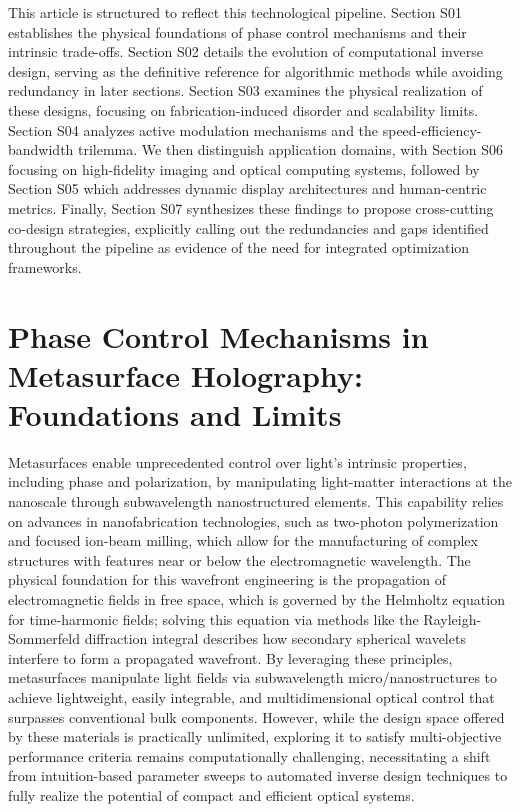 \documentclass[11pt]{article}
\begin{document}
This article is structured to reflect this technological pipeline. Section S01 establishes the physical foundations of phase control mechanisms and their intrinsic trade-offs. Section S02 details the evolution of computational inverse design, serving as the definitive reference for algorithmic methods while avoiding redundancy in later sections. Section S03 examines the physical realization of these designs, focusing on fabrication-induced disorder and scalability limits. Section S04 analyzes active modulation mechanisms and the speed-efficiency-bandwidth trilemma. We then distinguish application domains, with Section S06 focusing on high-fidelity imaging and optical computing systems, followed by Section S05 which addresses dynamic display architectures and human-centric metrics. Finally, Section S07 synthesizes these findings to propose cross-cutting co-design strategies, explicitly calling out the redundancies and gaps identified throughout the pipeline as evidence of the need for integrated optimization frameworks.

\section{Phase Control Mechanisms in Metasurface Holography: Foundations and Limits}\label{phase-control-mechanisms-in-metasurface-holography-foundations-and-limits}

Metasurfaces enable unprecedented control over light's intrinsic properties, including phase and polarization, by manipulating light-matter interactions at the nanoscale through subwavelength nanostructured elements. This capability relies on advances in nanofabrication technologies, such as two-photon polymerization and focused ion-beam milling, which allow for the manufacturing of complex structures with features near or below the electromagnetic wavelength. The physical foundation for this wavefront engineering is the propagation of electromagnetic fields in free space, which is governed by the Helmholtz equation for time-harmonic fields; solving this equation via methods like the Rayleigh-Sommerfeld diffraction integral describes how secondary spherical wavelets interfere to form a propagated wavefront. \citep{doi_10_21236_ada421453_63603a3f} \citep{doi_10_1364_ol_509688_f6e1ff85} By leveraging these principles, metasurfaces manipulate light fields via subwavelength micro/nanostructures to achieve lightweight, easily integrable, and multidimensional optical control that surpasses conventional bulk components. However, while the design space offered by these materials is practically unlimited, exploring it to satisfy multi-objective performance criteria remains computationally challenging, necessitating a shift from intuition-based parameter sweeps to automated inverse design techniques to fully realize the potential of compact and efficient optical systems. \citep{doi_10_1021_acsphotonics_3c00572_fda8f742} \citep{doi_10_1002_advs_202504634_52bafb6c} \citep{doi_10_1038_s41377_026_02272_y_42e58df2}
\end{document}
